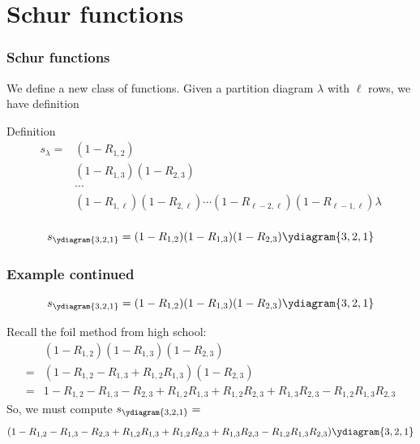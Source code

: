 \documentclass{beamer}
\begin{document}
\section{Schur functions}
\begin{frame}
  \frametitle{Schur functions}
  We define a new class of functions. Given a partition diagram
  \(\lambda\) with 
  \(\ell\) rows, we have definition
  \begin{block}{Definition}
    \begin{align*}
      s_\lambda = &(1-R_{1,2})\\
                  &(1-R_{1,3})(1-R_{2,3})\\
                  & \cdots\\
                  &(1-R_{1,
                    \ell})(1-R_{2,\ell})\cdots(1-R_{\ell-2,\ell})(1-R_{\ell-1,\ell})
                    \lambda\\
    \end{align*}
  \end{block}
    \begin{example}
      \[
        s_{\ydiagram{3,2,1}} = (1-R_{1,2})(1-R_{1,3})(1-R_{2,3})
        \ydiagram{3,2,1}
      \]
    \end{example}
\end{frame}
\begin{frame}
  \frametitle{Example continued}
    \begin{example}
    \[
      s_{\ydiagram{3,2,1}} = (1-R_{1,2})(1-R_{1,3})(1-R_{2,3})
      \ydiagram{3,2,1}
    \]
  \end{example}\pause
  Recall the foil method from high school:
  \begin{align*}
    &(1-R_{1,2})(1-R_{1,3})(1-R_{2,3}) \\
     = &(1-R_{1,2}-R_{1,3}+R_{1,2}R_{1,3})(1-R_{2,3}) \\
     = &1-R_{1,2}-R_{1,3}-R_{2,3}+R_{1,2}R_{1,3}+R_{1,2}R_{2,3}+R_{1,3}R_{2,3}-R_{1,2}R_{1,3}R_{2,3}
  \end{align*}\pause
  So, we must compute \(s_{\ydiagram{3,2,1}} = \)\[
    (1-R_{1,2}-R_{1,3}-R_{2,3}+R_{1,2}R_{1,3}+R_{1,2}R_{2,3}+R_{1,3}R_{2,3}-R_{1,2}R_{1,3}R_{2,3})\ydiagram{3,2,1}
  \]
\end{frame}
\end{document}
